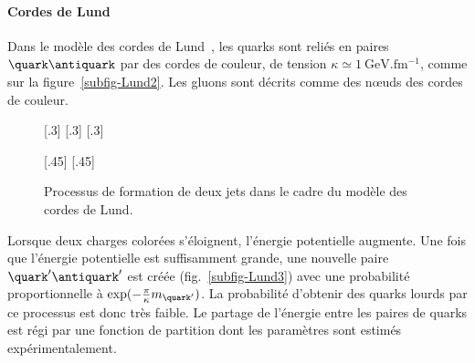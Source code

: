 \paragraph{Cordes de Lund}\label{chapter-MSSM-formation_jets-subsec-hadronisation-subsubsec-Lund}
Dans le modèle des cordes de Lund~\cite{Andersson_parton_fragmentation}, les quarks sont reliés en paires $\quark\antiquark$ par des \og cordes \fg{} de couleur, de tension $\kappa \simeq \SI{1}{\GeV.\femto\meter^{-1}}$, comme sur la figure~\ref{subfig-Lund2}. Les gluons sont décrits comme des nœuds des cordes de couleur.
\begin{figure}[h]
\centering
{}[.3\textwidth]
{}
\hfill
{}[.3\textwidth]
{}
\hfill
{}[.3\textwidth]
{}

\vspace{\baselineskip}

[.45\textwidth]
{}
\hfill
{}[.45\textwidth]
{}

\caption[Formation de jets dans le cadre du modèle des cordes de Lund.]{Processus de formation de deux jets dans le cadre du modèle des cordes de Lund.}
\label{fig-Lund}
\end{figure}
\par Lorsque deux charges colorées s'éloignent, l'énergie potentielle augmente.
Une fois que l'énergie potentielle est suffisamment grande, une nouvelle paire $\quark'\antiquark'$ est créée (fig.~\ref{subfig-Lund3}) avec une probabilité proportionnelle à $\exp(-\frac{\pi}{\kappa} m_{\quark'})$.
La probabilité d'obtenir des quarks lourds par ce processus est donc très faible.
Le partage de l'énergie entre les paires de quarks est régi par une fonction de partition dont les paramètres sont estimés expérimentalement.

